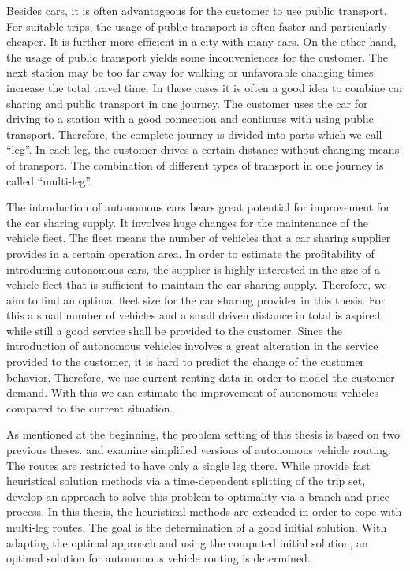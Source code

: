 Besides cars, it is often advantageous for the customer to use public transport. For suitable trips, the usage of public transport is often faster and particularly cheaper. It is further more efficient in a city with many cars. On the other hand, the usage of public transport yields some inconveniences for the customer. The next station may be too far away for walking or unfavorable changing times increase the total travel time. In these cases it is often a good idea to combine car sharing and public transport in one journey. The customer uses the car for driving to a station with a good connection and continues with using public transport. Therefore, the complete journey is divided into parts which we call \enquote{leg}. In each leg, the customer drives a certain distance without changing means of transport. The combination of different types of transport in one journey is called \enquote{multi-leg}.

The introduction of autonomous cars bears great potential for improvement for the car sharing supply. It involves huge changes for the maintenance of the vehicle fleet. The fleet means the number of vehicles that a car sharing supplier provides in a certain operation area. In order to estimate the profitability of introducing autonomous cars, the supplier is highly interested in the size of a vehicle fleet that is sufficient to maintain the car sharing supply. Therefore, we aim to find an optimal fleet size for the car sharing provider in this thesis. For this a small number of vehicles and a small driven distance in total is aspired, while still a good service shall be provided to the customer. Since the introduction of autonomous vehicles involves a great alteration in the service provided to the customer, it is hard to predict the change of the customer behavior. Therefore, we use current renting data in order to model the customer demand. With this we can estimate the improvement of autonomous vehicles compared to the current situation.

As mentioned at the beginning, the problem setting of this thesis is based on two previous theses. \cite{Kaiser} and \cite{Knoll} examine simplified versions of autonomous vehicle routing. The routes are restricted to have only a single leg there. While \cite{Knoll} provide fast heuristical solution methods via a time-dependent splitting of the trip set, \cite{Kaiser} develop an approach to solve this problem to optimality via a branch-and-price process. In this thesis, the heuristical methods are extended in order to cope with multi-leg routes. The goal is the determination of a good initial solution. With adapting the optimal approach and using the computed initial solution, an optimal solution for autonomous vehicle routing is determined.